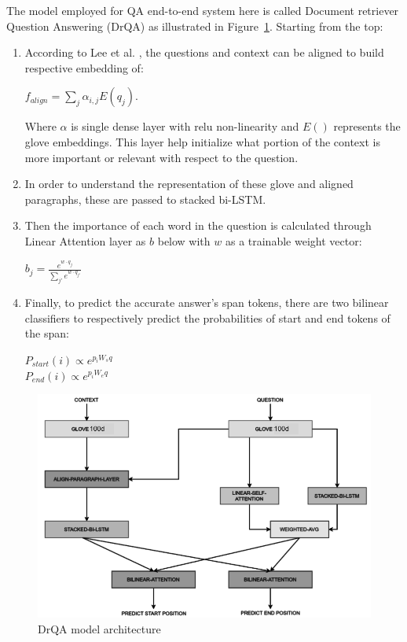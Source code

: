 The model employed for QA end-to-end system here is called Document retriever Question Answering (DrQA) as illustrated in Figure~\ref{fig:DrQA}.  Starting from the top:
\begin{enumerate}[start=1,label={\bfseries\arabic*:}]
    \item According to Lee et al. \cite{}, the questions and context can be aligned to build respective embedding of: 
    \begin{center} $f_{align} = \sum_j \alpha_{i, j} E(q_j)$. \end{center}
    
    Where $\alpha$ is single dense layer with relu non-linearity and $E()$ represents the glove embeddings. This layer help initialize what portion of the context is more important or relevant with respect to the question.
    
    \item In order to understand the representation of these glove and aligned paragraphs, these are passed to stacked bi-LSTM. 
    
    \item Then the importance of each word in the question is calculated through Linear Attention layer as $b$ below with $w$ as a trainable weight vector:
    \begin{center} 
    $b_j = \frac{e^{w \cdot q_j}}{\sum_{j'}e^{w\cdot q_{j'}}}$
    \end{center}
    
    \item Finally, to predict the accurate answer's span tokens, there are two bilinear classifiers to respectively predict the probabilities of start and end tokens of the span: 
    \begin{center} 
    $P_{start}(i) \propto e^{p_iW_sq}$ \\
    $P_{end}(i) \propto e^{p_iW_eq}$
    \end{center}
    
    
\end{enumerate}


\begin{figure}[!t]
    \centering
    \includegraphics[width=\linewidth]{img/DrQA.png}
    \caption{DrQA model architecture}
    \label{fig:DrQA}
\end{figure}

